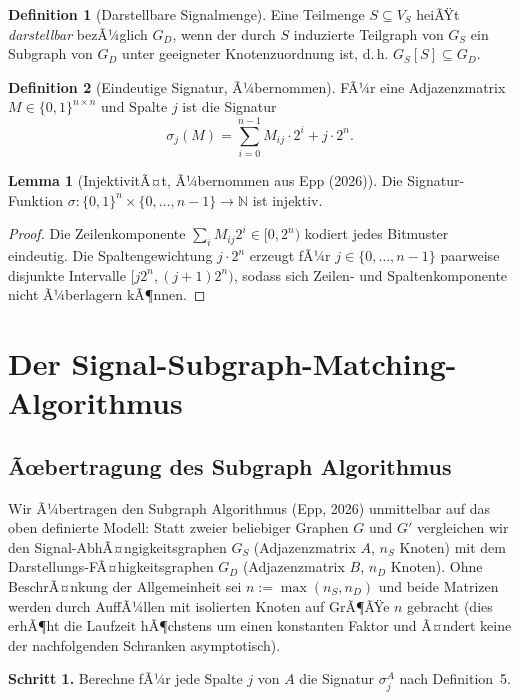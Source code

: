 ﻿\documentclass[a4paper,12pt]{article}
\theoremstyle{definition}
\newtheorem{definition}{Definition}
\newtheorem{lemma}{Lemma}
\begin{document}
\begin{definition}[Darstellbare Signalmenge]
	Eine Teilmenge $S \subseteq V_S$ heiÃŸt \emph{darstellbar} bezÃ¼glich $G_D$, wenn der durch $S$ induzierte Teilgraph von $G_S$ ein Subgraph von $G_D$ unter geeigneter Knotenzuordnung ist, d.\,h. $G_S[S] \subseteq G_D$.
\end{definition}

\begin{definition}[Eindeutige Signatur, Ã¼bernommen]
	FÃ¼r eine Adjazenzmatrix $M \in \{0,1\}^{n \times n}$ und Spalte $j$ ist die Signatur
	\[
	\sigma_j(M) = \sum_{i=0}^{n-1} M_{ij} \cdot 2^i + j \cdot 2^n.
	\]
\end{definition}

\begin{lemma}[InjektivitÃ¤t, Ã¼bernommen aus Epp (2026)]
\label{lem:injektiv}
	Die Signatur-Funktion $\sigma: \{0,1\}^n \times \{0,\ldots,n-1\} \to \mathbb{N}$ ist injektiv.
\end{lemma}
\begin{proof}
	Die Zeilenkomponente $\sum_i M_{ij} 2^i \in [0, 2^n)$ kodiert jedes Bitmuster eindeutig. Die Spaltengewichtung $j \cdot 2^n$ erzeugt fÃ¼r $j \in \{0,\ldots,n-1\}$ paarweise disjunkte Intervalle $[j 2^n, (j{+}1) 2^n)$, sodass sich Zeilen- und Spaltenkomponente nicht Ã¼berlagern kÃ¶nnen.
\end{proof}

\section{Der Signal-Subgraph-Matching-Algorithmus}

\subsection{Ãœbertragung des Subgraph Algorithmus}

Wir Ã¼bertragen den Subgraph Algorithmus (Epp, 2026) unmittelbar auf das oben definierte Modell: Statt zweier beliebiger Graphen $G$ und $G'$ vergleichen wir den Signal-AbhÃ¤ngigkeitsgraphen $G_S$ (Adjazenzmatrix $A$, $n_S$ Knoten) mit dem Darstellungs-FÃ¤higkeitsgraphen $G_D$ (Adjazenzmatrix $B$, $n_D$ Knoten). Ohne BeschrÃ¤nkung der Allgemeinheit sei $n := \max(n_S, n_D)$ und beide Matrizen werden durch AuffÃ¼llen mit isolierten Knoten auf GrÃ¶ÃŸe $n$ gebracht (dies erhÃ¶ht die Laufzeit hÃ¶chstens um einen konstanten Faktor und Ã¤ndert keine der nachfolgenden Schranken asymptotisch).

\textbf{Schritt 1.} Berechne fÃ¼r jede Spalte $j$ von $A$ die Signatur $\sigma_j^A$ nach Definition~5.
\end{document}
